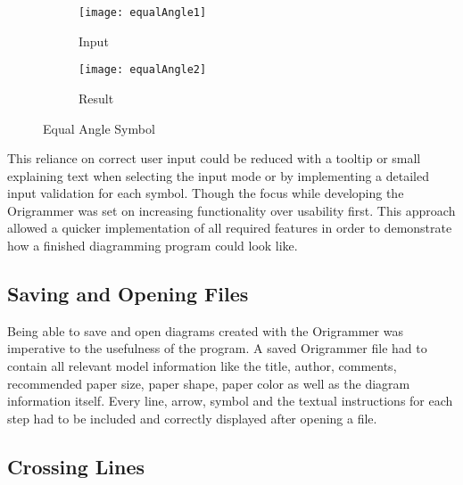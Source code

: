 \begin{figure*}[h]
    \centering
    \begin{subfigure}[b]{0.4\textwidth}
        \texttt{[image: equalAngle1]}
        \caption{Input}
        \label{fig:equalAngle1}
    \end{subfigure}
    \begin{subfigure}[b]{0.4\textwidth}
        \texttt{[image: equalAngle2]}
        \caption{Result}
        \label{fig:equalAngle2}
    \end{subfigure}
    \caption{Equal Angle Symbol}
\end{figure*}

This reliance on correct user input could be reduced with a tooltip or small explaining text when selecting the input mode or by implementing a detailed input validation for each symbol. Though the focus while developing the Origrammer was set on increasing functionality over usability first. This approach allowed a quicker implementation of all required features in order to demonstrate how a finished diagramming program could look like.


\subsection{Saving and Opening Files}

Being able to save and open diagrams created with the Origrammer was imperative to the usefulness of the program. A saved Origrammer file had to contain all relevant model information like the title, author, comments, recommended paper size, paper shape, paper color as well as the diagram information itself. Every line, arrow, symbol and the textual instructions for each step had to be included and correctly displayed after opening a file.


\subsection{Crossing Lines}

